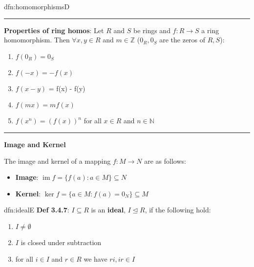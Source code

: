\documentclass[landscape, 8pt]{extarticle}
\DeclareMathOperator{\im}{im}
\begin{document}
\begin{multicols}{3}
\begin{dfn}{dfn:homomorphisms}{D}
    \vspace{-8pt}
    \noindent\rule{\textwidth}{0.2pt}

    \textbf{Properties of ring homos}: Let $R$ and $S$ be rings and $f : R \to S$ a ring homomorphism. Then $\forall x,y\in R$ and $m\in \mathbb{Z}$ ($0_{R}, 0_{S}$ are the zeros of $R, S$):

    \vspace{-15pt}
    \begin{multicols}{2}
    \begin{enumerate}
        \setlength\itemsep{0em}
        \item $f(0_{R}) = 0_{S}$
        \item $f(-x) = -f(x)$
        \item $f(x - y)$ = f(x) - f(y)
        \item $f(mx) = mf(x)$
        \item $f(x^{n}) = (f(x))^{n}$ for all $x\in R$ and $n\in \mathbb{N}$
    \end{enumerate}
    \end{multicols}
    
    \vspace{-13pt}
    \noindent\rule{\textwidth}{0.2pt}

    \textbf{Image and Kernel}

    The image and kernel of a mapping $f : M \to N$ are as follows:
    \vspace{-5pt}

    \begin{itemize}
        \setlength\itemsep{0em}
        \item \textbf{Image}: $\im f = \{f(a) : a\in M\}\subseteq N$
        \item \textbf{Kernel}: $\ker f = \{a\in M : f(a) = 0_{N}\} \subseteq M$
    \end{itemize}


\end{dfn}


\vspace{-5pt}
\begin{dfn}{dfn:ideal}{E}
    \vspace{-5pt}
    \textbf{Def 3.4.7}: $I \subseteq R$ is an \textbf{ideal}, $I \unlhd R$, if the following hold:
    \begin{enumerate}
        \setlength\itemsep{0em}
        \item $I \ne \emptyset$
        \item $I$ is closed under subtraction
        \item for all $i\in I$ and $r\in R$ we have $ri, ir\in I$
    \end{enumerate}


\end{dfn}
\end{multicols}
\end{document}

